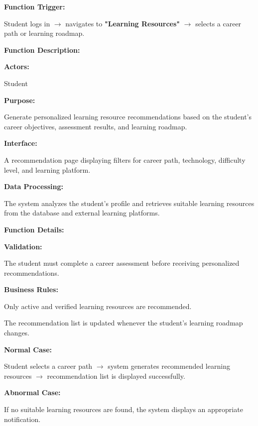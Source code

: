 \textbf{Function Trigger:}

Student logs in $\rightarrow$ navigates to \textbf{"Learning Resources"} $\rightarrow$ selects a career path or learning roadmap.

\vspace{0.3cm}

\textbf{Function Description:}

\textbf{Actors:}

Student

\vspace{0.2cm}

\textbf{Purpose:}

Generate personalized learning resource recommendations based on the student's career objectives, assessment results, and learning roadmap.

\vspace{0.2cm}

\textbf{Interface:}

A recommendation page displaying filters for career path, technology, difficulty level, and learning platform.

\vspace{0.2cm}

\textbf{Data Processing:}

The system analyzes the student's profile and retrieves suitable learning resources from the database and external learning platforms.

\vspace{0.3cm}

\textbf{Function Details:}

\textbf{Validation:}

The student must complete a career assessment before receiving personalized recommendations.

\textbf{Business Rules:}

Only active and verified learning resources are recommended.

The recommendation list is updated whenever the student's learning roadmap changes.

\textbf{Normal Case:}

Student selects a career path $\rightarrow$ system generates recommended learning resources $\rightarrow$ recommendation list is displayed successfully.

\textbf{Abnormal Case:}

If no suitable learning resources are found, the system displays an appropriate notification.

